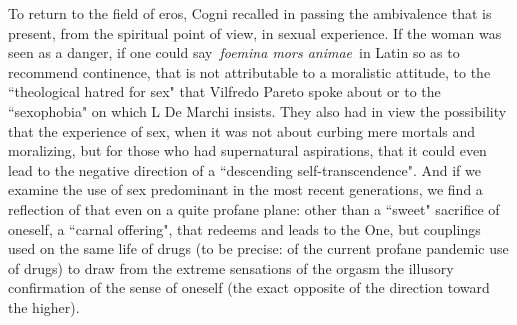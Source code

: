 To return to the field of eros, Cogni recalled in passing the ambivalence that is present, from the spiritual point of
view, in sexual experience. If the woman was seen as a danger, if one could say \emph{foemina mors animae} in Latin so
as to recommend continence, that is not attributable to a moralistic attitude, to the ``theological hatred for sex" that
Vilfredo Pareto spoke about or to the ``sexophobia" on which L De Marchi insists. They also had in view the possibility
that the experience of sex, when it was not about curbing mere mortals and moralizing, but for those who had
supernatural aspirations, that it could even lead to the negative direction of a ``descending self-transcendence". And
if we examine the use of sex predominant in the most recent generations, we find a reflection of that even on a quite
profane plane: other than a ``sweet" sacrifice of oneself, a ``carnal offering", that redeems and leads to the One, but
couplings used on the same life of drugs (to be precise: of the current profane pandemic use of drugs) to draw from the
extreme sensations of the orgasm the illusory confirmation of the sense of oneself (the exact opposite of the direction
toward the higher).

